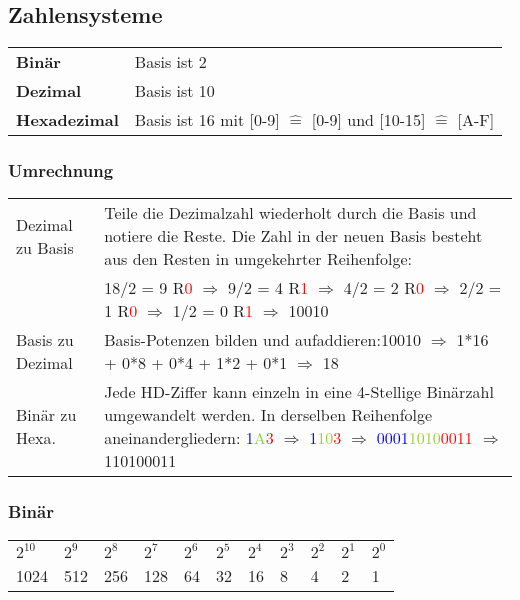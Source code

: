 \documentclass[a3paper, 10pt, landscape]{scrartcl}
\begin{document}
\begin{multicols*}{3}
\begin{itemize}
		
	\end{itemize}
	
	\subsection{Zahlensysteme}
	
	\begin{tabular}{l l}
		\textbf{Binär} & Basis ist 2 \\
		\textbf{Dezimal} & Basis ist 10 \\
		\textbf{Hexadezimal} & Basis ist 16 mit [0-9] $\hat{=}$ [0-9] und [10-15] $\hat{=}$ [A-F]
	\end{tabular}
	
	\subsubsection{Umrechnung}
	\begin{tabular}{p{1.3cm} p{11.3cm}}
	Dezimal zu Basis & Teile die Dezimalzahl wiederholt durch die Basis und notiere die Reste. Die Zahl in der neuen Basis besteht aus den Resten in umgekehrter Reihenfolge:\\
        & \makecell[l]{18/2 = 9 R\textcolor{red}{0} $\Rightarrow$ 9/2 = 4 R\textcolor{red}{1} $\Rightarrow$ 4/2 = 2 R\textcolor{red}{0} $\Rightarrow$ 2/2 = 1 R\textcolor{red}{0} $\Rightarrow$ 1/2 = 0 R\textcolor{red}{1} \\ $\Rightarrow$ 10010} \\	 \hline
	Basis zu Dezimal & Basis-Potenzen bilden und aufaddieren:10010 $\Rightarrow$ 1*16 + 0*8 + 0*4 + 1*2 + 0*1 $\Rightarrow$ 18 \\ \hline
        Binär zu Hexa. & Jede HD-Ziffer kann einzeln in eine 4-Stellige Binärzahl umgewandelt werden. In derselben Reihenfolge aneinandergliedern: \textcolor{blue}{1}\textcolor{YellowGreen}{A}\textcolor{red}{3} $\Rightarrow$ \textcolor{blue}{1}\textcolor{YellowGreen}{10}\textcolor{red}{3} $\Rightarrow$ \textcolor{blue}{0001}\textcolor{YellowGreen}{1010}\textcolor{red}{0011} $\Rightarrow$ 110100011\\
	
		
	\end{tabular}
 
        \subsubsection{Binär}
	\begin{tabular}{l l l l l l l l l l l }
        $2^{10}$ & $2^9$ & $2^8$ & $2^7$ & $2^6$ & $2^5$ & $2^4$ & $2^3$ & $2^2$ & $2^1$ & $2^0$ \\
        1024 & 512 & 256 & 128 & 64 & 32 & 16 & 8 & 4 & 2 & 1 \\
        \end{tabular}

\end{multicols*}
\end{document}
